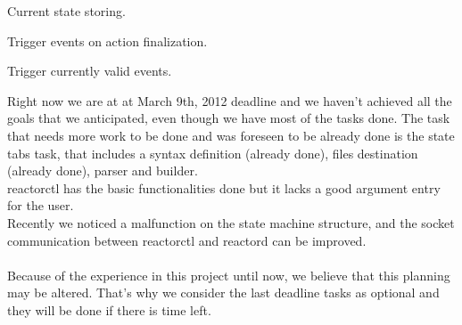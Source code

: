 \documentclass[a4paper,11pt]{article}
\begin{document}
\begin{multicols}{2}
\begin{list}{-}{April 27th, 2012}
  \item Current state storing.
  \item Trigger events on action finalization.
  \item Trigger currently valid events.
\end{list}
\end{multicols}
\normalsize
Right now we are at at March 9th, 2012 deadline and we haven't achieved all the goals
that we anticipated, even though we have most of the tasks done. The task that needs
more work to be done and was foreseen to be already done is the state tabs task, that
includes a syntax definition (already done), files destination (already done), parser 
and builder.\\
reactorctl has the basic functionalities done but it lacks a good argument entry for the
user.\\
Recently we noticed a malfunction on the state machine structure, and the socket 
communication between reactorctl and reactord can be improved.\\
\\
Because of the experience in this project until now, we believe that this planning may be
altered. That's why we consider the last deadline tasks as optional and they will be done if 
there is time left.
\end{document}
